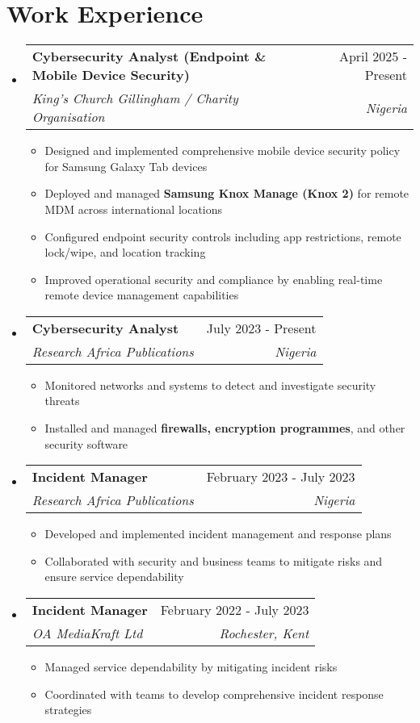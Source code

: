 \documentclass[a4paper,11pt]{article}
\makeatletter
\newcommand{\resumeItem}[1]{
  \item\small{
    {#1 \vspace{-2pt}}
  }
}
\newcommand{\resumeSubheading}[4]{
  \vspace{-2pt}\item
    \begin{tabular*}{0.97\textwidth}[t]{l@{\extracolsep{\fill}}r}
      \textbf{#1} & #2 \\
      \textit{\small#3} & \textit{\small #4} \\
    \end{tabular*}\vspace{-7pt}
}
\newcommand{\resumeSubHeadingListStart}{\begin{itemize}[leftmargin=0.15in, label={}]}
\newcommand{\resumeSubHeadingListEnd}{\end{itemize}}
\newcommand{\resumeItemListStart}{\begin{itemize}}
\newcommand{\resumeItemListEnd}{\end{itemize}\vspace{-5pt}}
\makeatother
\begin{document}
\section{Work Experience}
  \resumeSubHeadingListStart

    \resumeSubheading
    {Cybersecurity Analyst (Endpoint \& Mobile Device Security)}{April 2025 - Present}
    {King's Church Gillingham / Charity Organisation}{Nigeria}
        \resumeItemListStart
            \resumeItem{Designed and implemented comprehensive mobile device security policy for Samsung Galaxy Tab devices}
            \resumeItem{Deployed and managed \textbf{Samsung Knox Manage (Knox 2)} for remote MDM across international locations}
            \resumeItem{Configured endpoint security controls including app restrictions, remote lock/wipe, and location tracking}
            \resumeItem{Improved operational security and compliance by enabling real-time remote device management capabilities}
        \resumeItemListEnd

    \resumeSubheading
    {Cybersecurity Analyst}{July 2023 - Present}
    {Research Africa Publications}{Nigeria}
        \resumeItemListStart
            \resumeItem{Monitored networks and systems to detect and investigate security threats}
            \resumeItem{Installed and managed \textbf{firewalls, encryption programmes}, and other security software}
        \resumeItemListEnd

    \resumeSubheading
    {Incident Manager}{February 2023 - July 2023}
    {Research Africa Publications}{Nigeria}
        \resumeItemListStart
            \resumeItem{Developed and implemented incident management and response plans}
            \resumeItem{Collaborated with security and business teams to mitigate risks and ensure service dependability}
        \resumeItemListEnd

    \resumeSubheading
    {Incident Manager}{February 2022 - July 2023}
    {OA MediaKraft Ltd}{Rochester, Kent}
        \resumeItemListStart
            \resumeItem{Managed service dependability by mitigating incident risks}
            \resumeItem{Coordinated with teams to develop comprehensive incident response strategies}
        \resumeItemListEnd

  \resumeSubHeadingListEnd

\end{document}
